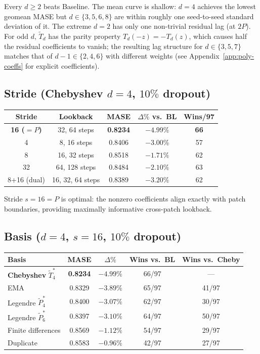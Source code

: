 \documentclass[11pt]{article}
\theoremstyle{plain}
\theoremstyle{definition}
\theoremstyle{remark}
\begin{document}
Every $d \geq 2$ beats Baseline. The mean curve is shallow: $d=4$ achieves the lowest geomean MASE but $d \in \{3, 5, 6, 8\}$ are within roughly one seed-to-seed standard deviation of it. The extreme $d=2$ has only one non-trivial residual lag (at $2P$). For odd $d$, $\tilde T_d$ has the parity property $T_d(-z) = -T_d(z)$, which causes half the residual coefficients to vanish; the resulting lag structure for $d \in \{3, 5, 7\}$ matches that of $d - 1 \in \{2, 4, 6\}$ with different weights (see Appendix~\ref{app:poly-coeffs} for explicit coefficients).

\subsection{Stride (Chebyshev $d=4$, $10\%$ dropout)}

\begin{table}[h]
\centering
\small
\begin{tabular}{ccccc}
\toprule
\textbf{Stride} & \textbf{Lookback} & \textbf{MASE} & \textbf{$\Delta\%$ vs.\ BL} & \textbf{Wins/97} \\
\midrule
\textbf{16 ($=P$)} & 32, 64 steps & \textbf{0.8234} & $\mathbf{-4.99\%}$ & \textbf{66} \\
4 & 8, 16 steps & 0.8406 & $-3.00\%$ & 57 \\
8 & 16, 32 steps & 0.8518 & $-1.71\%$ & 62 \\
32 & 64, 128 steps & 0.8484 & $-2.10\%$ & 63 \\
8+16 (dual) & 16, 32, 64 steps & 0.8389 & $-3.20\%$ & 62 \\
\bottomrule
\end{tabular}
\end{table}

Stride $s = 16 = P$ is optimal: the nonzero coefficients align exactly with patch boundaries, providing maximally informative cross-patch lookback.

\subsection{Basis ($d=4$, $s=16$, $10\%$ dropout)}

\begin{table}[h]
\centering
\small
\begin{tabular}{lcccc}
\toprule
\textbf{Basis} & \textbf{MASE} & \textbf{$\Delta\%$} & \textbf{Wins vs.\ BL} & \textbf{Wins vs.\ Cheby} \\
\midrule
\textbf{Chebyshev} $\tilde T_4^*$ & \textbf{0.8234} & $\mathbf{-4.99\%}$ & 66/97 & --- \\
EMA & 0.8329 & $-3.89\%$ & 65/97 & 41/97 \\
Legendre $\tilde P_4^*$ & 0.8400 & $-3.07\%$ & 62/97 & 30/97 \\
Legendre $\tilde P_6^*$ & 0.8397 & $-3.10\%$ & 64/97 & 50/97 \\
Finite differences & 0.8569 & $-1.12\%$ & 54/97 & 29/97 \\
Duplicate & 0.8583 & $-0.96\%$ & 42/97 & 27/97 \\
\bottomrule
\end{tabular}
\label{tab:basis-ablation}
\end{table}
\end{document}
